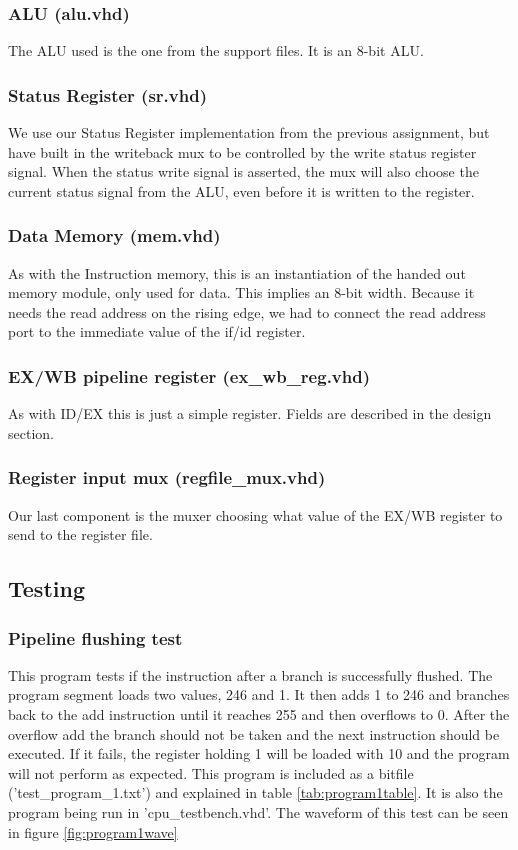 \documentclass[11pt]{report}
\begin{document}
\subsubsection*{ALU (alu.vhd)}
The ALU used is the one from the support files. It is an 8-bit ALU.
\subsubsection*{Status Register (sr.vhd)}
We use our Status Register implementation from the previous assignment, but have
built in the writeback mux to be controlled by the write status register signal.
When the status write signal is asserted, the mux will also choose the current 
status signal from the ALU, even before it is written to the register.
\subsubsection*{Data Memory (mem.vhd)}
As with the Instruction memory, this is an instantiation of the handed out memory
module, only used for data. This implies an 8-bit width. Because it needs the read address
on the rising edge, we had to connect the read address port to the immediate value of the
if/id register.
\subsubsection*{EX/WB pipeline register (ex\_wb\_reg.vhd)}
As with ID/EX this is just a simple register. Fields are described in the design section.
\subsubsection*{Register input mux (regfile\_mux.vhd)}
Our last component is the muxer choosing what value of the EX/WB register to send to the
register file. 


\subsection*{Testing}

\subsubsection*{Pipeline flushing test}

This program tests if the instruction after a branch is successfully flushed.
The program segment loads two values, 246 and 1. It then adds 1 to 246 and
branches back to the add instruction until it reaches 255 and then overflows
to 0. After the overflow add the branch should not be taken and the next instruction
should be executed. If it fails, the register holding 1 will be loaded with 10
and the program will not perform as expected. This program is included as a bitfile
('test\_program\_1.txt') and explained in table \ref{tab:program1table}. It is also the 
program being run in 'cpu\_testbench.vhd'.
The waveform of this test can be seen in figure \ref{fig:program1wave}
\end{document}

